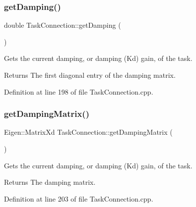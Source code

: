 \subsubsection{\texorpdfstring{get\+Damping()}{getDamping()}}
{\footnotesize\ttfamily double Task\+Connection\+::get\+Damping (\begin{DoxyParamCaption}{ }\end{DoxyParamCaption})}

Gets the current damping, or damping (Kd) gain, of the task.

\begin{DoxyReturn}{Returns}
The first diagonal entry of the damping matrix. 
\end{DoxyReturn}


Definition at line 198 of file Task\+Connection.\+cpp.

\hypertarget{classocra__recipes_1_1TaskConnection_a4176118231f2c5e17e4f749999c9456e}{}\label{classocra__recipes_1_1TaskConnection_a4176118231f2c5e17e4f749999c9456e} 
\subsubsection{\texorpdfstring{get\+Damping\+Matrix()}{getDampingMatrix()}}
{\footnotesize\ttfamily Eigen\+::\+Matrix\+Xd Task\+Connection\+::get\+Damping\+Matrix (\begin{DoxyParamCaption}{ }\end{DoxyParamCaption})}

Gets the current damping, or damping (Kd) gain, of the task.

\begin{DoxyReturn}{Returns}
The damping matrix. 
\end{DoxyReturn}


Definition at line 203 of file Task\+Connection.\+cpp.

\hypertarget{classocra__recipes_1_1TaskConnection_a655f96a4c535179184edf67a961776e7}{}\label{classocra__recipes_1_1TaskConnection_a655f96a4c535179184edf67a961776e7} 
